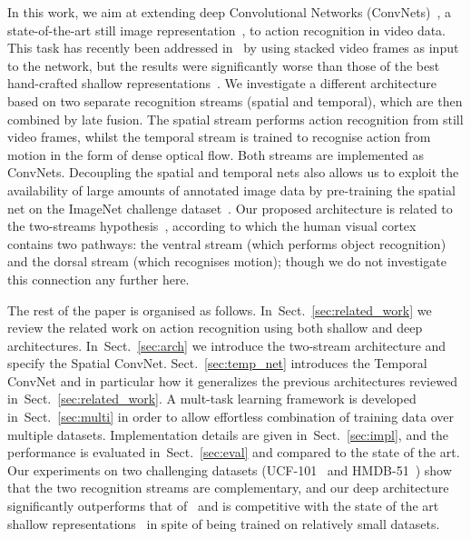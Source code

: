 \documentclass{article} %
\newcommand{\sref}[1]{Sect.~\ref{#1}}
\begin{document}
In this work, we aim at extending deep Convolutional Networks
(ConvNets)~\cite{Lecun89}, a state-of-the-art still image
representation~\cite{Krizhevsky12}, to action recognition in video data. This task
has
recently been  addressed in~\cite{Karpathy14} by using stacked video frames
as input to the network, but the results were significantly worse than
those of the best hand-crafted shallow
representations~\cite{Wang13b,Peng14}.  We investigate a different architecture
based on two separate recognition streams (spatial and
temporal), which are then combined by late fusion.  The spatial stream
performs action recognition from still video frames, whilst the
temporal stream is trained to recognise action from motion in the form
of dense optical flow.  Both streams are implemented as ConvNets.
Decoupling the spatial and temporal nets also allows us to
exploit the availability of large amounts of annotated image data by
pre-training the spatial net on the ImageNet challenge
dataset~\cite{Berg10a}.  Our proposed architecture is related
to the two-streams
hypothesis~\cite{Goodale92}, according to which the human visual
cortex contains two pathways: the ventral stream (which performs
object recognition) and the dorsal stream (which recognises
motion); though we do not investigate this connection any further here.


The rest of the paper is organised as
follows. In~\sref{sec:related_work} we review the related work on
action recognition using both shallow and deep architectures. In~\sref{sec:arch}
we introduce the two-stream architecture and specify the Spatial ConvNet. 
\sref{sec:temp_net} introduces the Temporal ConvNet and in particular how
it generalizes the previous architectures reviewed in~\sref{sec:related_work}.
A mult-task learning framework is developed in~\sref{sec:multi} in
order to allow effortless combination of training data over multiple datasets.
Implementation details are given in~\sref{sec:impl}, and the performance is evaluated
in~\sref{sec:eval} and compared to the state of the art.
Our experiments on two challenging datasets
(UCF-101~\cite{Soomro12} and HMDB-51~\cite{Kuehne11}) show that the
two recognition streams are complementary, and our deep architecture
significantly outperforms that of~\cite{Karpathy14} and is competitive
with the state of the art shallow
representations~\cite{Wang13b,Peng14,Peng14a} in spite of being trained on
relatively small datasets.
\end{document}
